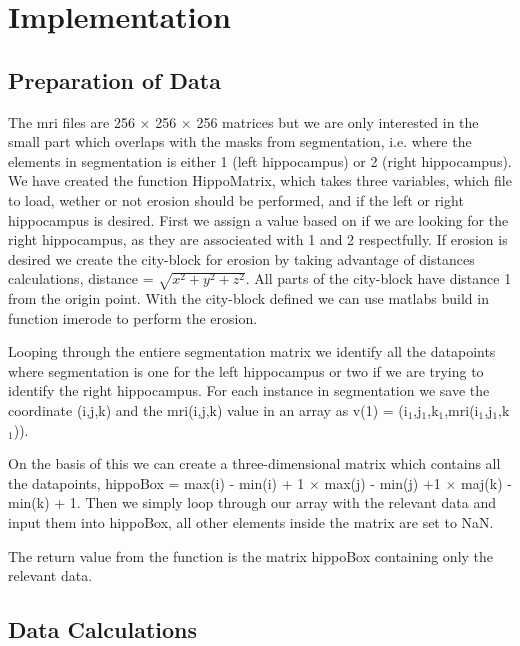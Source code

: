 \chapter{Implementation}

\section{Preparation of Data}
The mri files are 256 $\times$ 256 $\times$ 256 matrices but we are only interested in the small part which overlaps with the masks from segmentation, i.e. where the elements in segmentation is either 1 (left hippocampus) or 2 (right hippocampus).
We have created the function HippoMatrix, which takes three variables, which file to load, wether or not erosion should be performed, and if the left or right hippocampus is desired.
First we assign a value based on if we are looking for the right hippocampus, as they are associeated with 1 and 2 respectfully.
If erosion is desired we create the city-block for erosion by taking advantage of distances calculations, distance = $\sqrt{x^2+y^2+z^2}$. All parts of the city-block have distance 1 from the origin point. With the city-block defined we can use matlabs build in function imerode to perform the erosion. 

Looping through the entiere segmentation matrix we identify all the datapoints where segmentation is one for the left hippocampus or two if we are trying to identify the right hippocampus. For each instance in segmentation we save the coordinate (i,j,k) and the mri(i,j,k) value in an array as v(1) = (i$_1$,j$_1$,k$_1$,mri(i$_1$,j$_1$,k$_1$)).

On the basis of this we can create a three-dimensional matrix which contains all the datapoints, hippoBox = max(i) - min(i) + 1 $\times$ max(j) - min(j) +1 $\times$ maj(k) - min(k) + 1.
Then we simply loop through our array with the relevant data and input them into hippoBox, all other elements inside the matrix are set to NaN. 

The return value from the function is the matrix hippoBox containing only the relevant data.

\section{Data Calculations}

